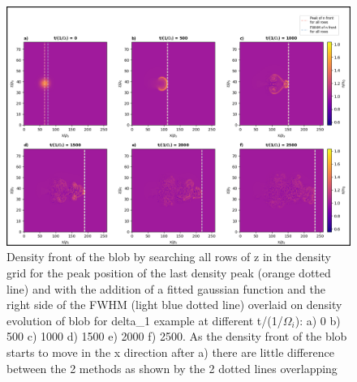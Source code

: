 \documentclass{article}
\begin{document}
\begin{arrowlist}
\begin{itemize}
\begin{itemize}
    \begin{figure}
        \centering
        \includegraphics[width=\textwidth]{./Fig/Fig13 vel n front vs FWHM hmap t0_t50.png}
        \normalsize{\caption{Density front of the blob by searching all rows of z in the density grid for the peak position of the last density peak (orange dotted line) and with the addition of a fitted gaussian function and the right side of the FWHM (light blue dotted line) overlaid on density evolution of blob for delta\_1 example at different t/(1/$\Omega_i$): a) 0 b) 500 c) 1000 d) 1500 e) 2000 f) 2500. As the density front of the blob starts to move in the x direction after a) there are little difference between the 2 methods as shown by the 2 dotted lines overlapping}
        \label{fig:fig13}}
    \end{figure}


\end{itemize}
\end{itemize}
\end{arrowlist}
\end{document}
